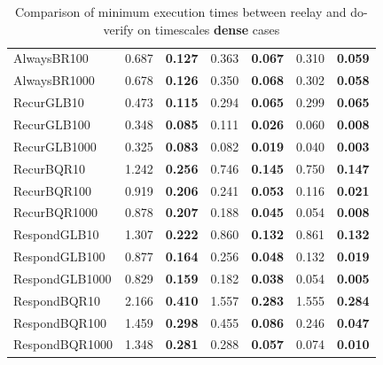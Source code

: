 \documentclass[a4paper,12pt]{report}
\begin{document}
\begin{table}[htbp]
\begin{tabular}{lrrrrrr}
AlwaysBR100 & 0.687 & \textbf{0.127} & 0.363 & \textbf{0.067} & 0.310 & \textbf{0.059} \\
AlwaysBR1000 & 0.678 & \textbf{0.126} & 0.350 & \textbf{0.068} & 0.302 & \textbf{0.058} \\
RecurGLB10 & 0.473 & \textbf{0.115} & 0.294 & \textbf{0.065} & 0.299 & \textbf{0.065} \\
RecurGLB100 & 0.348 & \textbf{0.085} & 0.111 & \textbf{0.026} & 0.060 & \textbf{0.008} \\
RecurGLB1000 & 0.325 & \textbf{0.083} & 0.082 & \textbf{0.019} & 0.040 & \textbf{0.003} \\
RecurBQR10 & 1.242 & \textbf{0.256} & 0.746 & \textbf{0.145} & 0.750 & \textbf{0.147} \\
RecurBQR100 & 0.919 & \textbf{0.206} & 0.241 & \textbf{0.053} & 0.116 & \textbf{0.021} \\
RecurBQR1000 & 0.878 & \textbf{0.207} & 0.188 & \textbf{0.045} & 0.054 & \textbf{0.008} \\
RespondGLB10 & 1.307 & \textbf{0.222} & 0.860 & \textbf{0.132} & 0.861 & \textbf{0.132} \\
RespondGLB100 & 0.877 & \textbf{0.164} & 0.256 & \textbf{0.048} & 0.132 & \textbf{0.019} \\
RespondGLB1000 & 0.829 & \textbf{0.159} & 0.182 & \textbf{0.038} & 0.054 & \textbf{0.005} \\
RespondBQR10 & 2.166 & \textbf{0.410} & 1.557 & \textbf{0.283} & 1.555 & \textbf{0.284} \\
RespondBQR100 & 1.459 & \textbf{0.298} & 0.455 & \textbf{0.086} & 0.246 & \textbf{0.047} \\
RespondBQR1000 & 1.348 & \textbf{0.281} & 0.288 & \textbf{0.057} & 0.074 & \textbf{0.010} \\
\bottomrule
\end{tabular}
\caption{\small Comparison of minimum execution times between reelay and do-verify on timescales \textbf{dense} cases}
\label{tab:dense_timescales}
\end{table}

\end{document}
